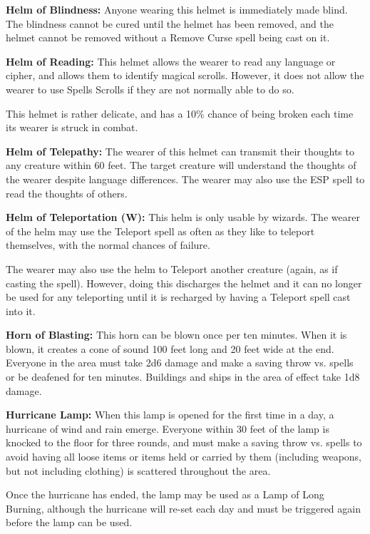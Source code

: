\begin{multicols*}{2}
\textbf{Helm of Blindness:} Anyone wearing this helmet is immediately made blind. The blindness cannot be cured until the helmet has been removed, and the helmet cannot be removed without a Remove Curse spell being cast on it.

\textbf{Helm of Reading:} This helmet allows the wearer to read any language or cipher, and allows them to identify magical scrolls. However, it does not allow the wearer to use Spells Scrolls if they are not normally able to do so.

This helmet is rather delicate, and has a 10\% chance of being broken each time its wearer is struck in combat.

\textbf{Helm of Telepathy:} The wearer of this helmet can transmit their thoughts to any creature within 60 feet. The target creature will understand the thoughts of the wearer despite language differences. The wearer may also use the ESP spell to read the thoughts of others.

\textbf{Helm of Teleportation (W):} This helm is only usable by wizards. The wearer of the helm may use the Teleport spell as often as they like to teleport themselves, with the normal chances of failure.

The wearer may also use the helm to Teleport another creature (again, as if casting the spell). However, doing this discharges the helmet and it can no longer be used for any teleporting until it is recharged by having a Teleport spell cast into it.

\textbf{Horn of Blasting:} This horn can be blown once per ten minutes. When it is blown, it creates a cone of sound 100 feet long and 20 feet wide at the end. Everyone in the area must take 2d6 damage and make a saving throw vs. spells or be deafened for ten minutes. Buildings and ships in the area of effect take 1d8 damage.

\textbf{Hurricane Lamp:} When this lamp is opened for the first time in a day, a hurricane of wind and rain emerge. Everyone within 30 feet of the lamp is knocked to the floor for three rounds, and must make a saving throw vs. spells to avoid having all loose items or items held or carried by them (including weapons, but not including clothing) is scattered throughout the area.

Once the hurricane has ended, the lamp may be used as a Lamp of Long Burning, although the hurricane will re-set each day and must be triggered again before the lamp can be used.


\end{multicols*}
